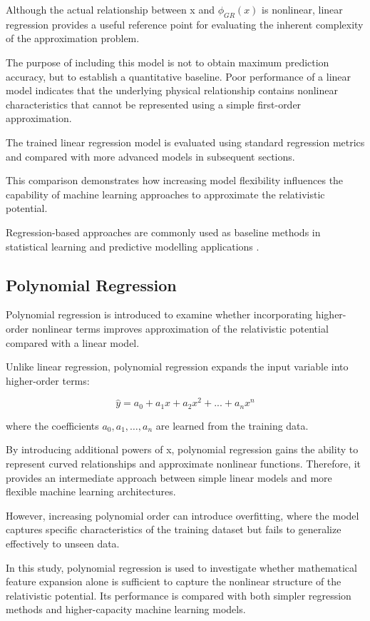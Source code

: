 \documentclass[
]{article}
\begin{document}
Although the actual relationship between x and $\phi_{GR}(x)$ is
nonlinear, linear regression provides a useful reference point for
evaluating the inherent complexity of the approximation problem.

The purpose of including this model is not to obtain maximum prediction
accuracy, but to establish a quantitative baseline. Poor performance of
a linear model indicates that the underlying physical relationship
contains nonlinear characteristics that cannot be represented using a
simple first-order approximation.

The trained linear regression model is evaluated using standard
regression metrics and compared with more advanced models in subsequent
sections.

This comparison demonstrates how increasing model flexibility influences
the capability of machine learning approaches to approximate the
relativistic potential.

Regression-based approaches are commonly used as baseline methods in
statistical learning and predictive modelling applications
\cite{bishop2006, hastie2009}.

\subsection{Polynomial Regression}\label{polynomial-regression}

Polynomial regression is introduced to examine whether incorporating
higher-order nonlinear terms improves approximation of the relativistic
potential compared with a linear model.

Unlike linear regression, polynomial regression expands the input
variable into higher-order terms:

\[
\hat{y}=a_0+a_1x+a_2x^2+...+a_nx^n
\]

where the coefficients $a_0, a_1, \ldots, a_n$ are learned from the
training data.

By introducing additional powers of x, polynomial regression gains the
ability to represent curved relationships and approximate nonlinear
functions. Therefore, it provides an intermediate approach between
simple linear models and more flexible machine learning architectures.

However, increasing polynomial order can introduce overfitting, where
the model captures specific characteristics of the training dataset but
fails to generalize effectively to unseen data.

In this study, polynomial regression is used to investigate whether
mathematical feature expansion alone is sufficient to capture the
nonlinear structure of the relativistic potential. Its performance is
compared with both simpler regression methods and higher-capacity
machine learning models.
\end{document}
